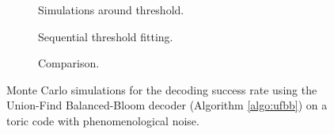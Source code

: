 \begin{figure}[htbp]
  \centering
  \begin{subfigure}[b]{0.49\textwidth}
    \begin{adjustbox}{Clip=0 1em 0 0}
      
    \end{adjustbox}
    \caption{Simulations around threshold.}
  \end{subfigure}
  \begin{subfigure}[b]{0.49\textwidth}
    \begin{adjustbox}{Clip=0 1em 0 0}
      
    \end{adjustbox}
    \caption{Sequential threshold fitting.}
  \end{subfigure}
  \begin{subfigure}[b]{\textwidth}
    \begin{adjustbox}{Clip=0 1em 0 0}
    
    \end{adjustbox}
    \caption{Comparison.}
  \end{subfigure}
  \caption{Monte Carlo simulations for the decoding success rate using the Union-Find Balanced-Bloom decoder (Algorithm \ref{algo:ufbb}) on a toric code with phenomenological noise.}
  \label{fig:thres_ufbb_toric_3d}
\end{figure}

